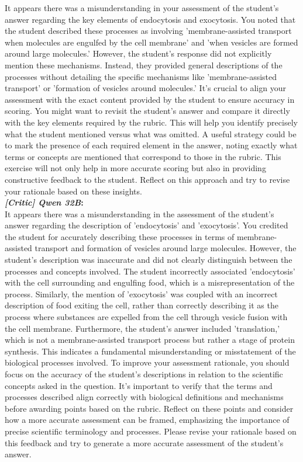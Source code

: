 \begin{figure*}
\begin{tcolorbox}[
    colback=gray!10,      %
    colframe=gray!80,     %
    title=Case Study 5,
    fonttitle=\bfseries,  %
    rounded corners,
    boxrule=0.5mm,        %
    width=\linewidth
]
It appears there was a misunderstanding in your assessment of the student's answer regarding the key elements of endocytosis and exocytosis. You noted that the student described these processes as involving 'membrane-assisted transport when molecules are engulfed by the cell membrane' and 'when vesicles are formed around large molecules.' However, the student's response did not explicitly mention these mechanisms. Instead, they provided general descriptions of the processes without detailing the specific mechanisms like 'membrane-assisted transport' or 'formation of vesicles around molecules.' It's crucial to align your assessment with the exact content provided by the student to ensure accuracy in scoring. You might want to revisit the student's answer and compare it directly with the key elements required by the rubric. This will help you identify precisely what the student mentioned versus what was omitted. A useful strategy could be to mark the presence of each required element in the answer, noting exactly what terms or concepts are mentioned that correspond to those in the rubric. This exercise will not only help in more accurate scoring but also in providing constructive feedback to the student. Reflect on this approach and try to revise your rationale based on these insights.\\
\textbf{\emph{[Critic] Qwen 32B}:}\\
It appears there was a misunderstanding in the assessment of the student's answer regarding the description of 'endocytosis' and 'exocytosis'. You credited the student for accurately describing these processes in terms of membrane-assisted transport and formation of vesicles around large molecules. However, the student's description was inaccurate and did not clearly distinguish between the processes and concepts involved. The student incorrectly associated 'endocytosis' with the cell surrounding and engulfing food, which is a misrepresentation of the process. Similarly, the mention of 'exocytosis' was coupled with an incorrect description of food exiting the cell, rather than correctly describing it as the process where substances are expelled from the cell through vesicle fusion with the cell membrane. Furthermore, the student's answer included 'translation,' which is not a membrane-assisted transport process but rather a stage of protein synthesis. This indicates a fundamental misunderstanding or misstatement of the biological processes involved. To improve your assessment rationale, you should focus on the accuracy of the student's descriptions in relation to the scientific concepts asked in the question. It's important to verify that the terms and processes described align correctly with biological definitions and mechanisms before awarding points based on the rubric. Reflect on these points and consider how a more accurate assessment can be framed, emphasizing the importance of precise scientific terminology and processes. Please revise your rationale based on this feedback and try to generate a more accurate assessment of the student's answer.

\end{tcolorbox}
\end{figure*}

